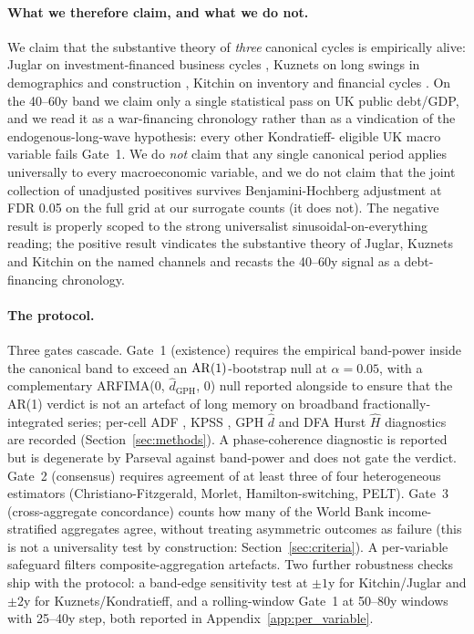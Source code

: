 \paragraph{What we therefore claim, and what we do not.}
We claim that the substantive theory of \emph{three} canonical
cycles is empirically alive: Juglar on investment-financed
business cycles \citep{schumpeter1939,juglar1862}, Kuznets on
long swings in demographics and construction \citep{kuznets1930},
Kitchin on inventory and financial cycles
\citep{kitchin1923,metzler1941,wen2005,borio2014}. On the
40--60y band we claim only a single statistical pass on UK
public debt/GDP, and we read it as a
\citet{reinhart_rogoff2009} war-financing chronology rather
than as a vindication of the \citet{kondratieff1925}
endogenous-long-wave hypothesis: every other Kondratieff-
eligible UK macro variable fails Gate~1. We do \emph{not} claim
that any single canonical period applies universally to every
macroeconomic variable, and we do not claim that the joint
collection of unadjusted positives survives Benjamini-Hochberg
adjustment at FDR 0.05 on the full grid at our surrogate counts
(it does not). The negative result is properly scoped to the
strong universalist sinusoidal-on-everything reading; the
positive result vindicates the substantive theory of Juglar,
Kuznets and Kitchin on the named channels and recasts the
40--60y signal as a debt-financing chronology.

\paragraph{The protocol.}
Three gates cascade. Gate~1 (existence) requires the empirical
band-power inside the canonical band to exceed an
\(\mathrm{AR}(1)\)-bootstrap null at \(\alpha=0.05\), with a
complementary ARFIMA(0, \(\hat d_{\mathrm{GPH}}\), 0)
\citep{granger_joyeux1980,hosking1981,baillie1996} null reported
alongside to ensure that the AR(1) verdict is not an artefact
of long memory on broadband fractionally-integrated series;
per-cell ADF \citep{dickey_fuller1979}, KPSS \citep{kpss1992},
GPH \(\hat d\) \citep{geweke_porter_hudak1983} and DFA Hurst
\(\hat H\) \citep{peng1994} diagnostics are recorded
(Section~\ref{sec:methods}). A phase-coherence diagnostic
\citep{theiler_et_al1992,schreiber_schmitz2000} is reported but
is degenerate by Parseval against band-power and does not gate
the verdict. Gate~2 (consensus) requires agreement of at least
three of four heterogeneous estimators (Christiano-Fitzgerald,
Morlet, Hamilton-switching, PELT). Gate~3 (cross-aggregate
concordance) counts how many of the World Bank
income-stratified aggregates agree, without treating asymmetric
outcomes as failure (this is not a universality test by
construction: Section~\ref{sec:criteria}). A per-variable
safeguard \citep{wen2005} filters composite-aggregation
artefacts. Two further robustness checks ship with the
protocol: a band-edge sensitivity test at \(\pm 1\)y for
Kitchin/Juglar and \(\pm 2\)y for Kuznets/Kondratieff, and a
rolling-window Gate~1 at 50--80y windows with 25--40y step, both
reported in Appendix~\ref{app:per_variable}.

